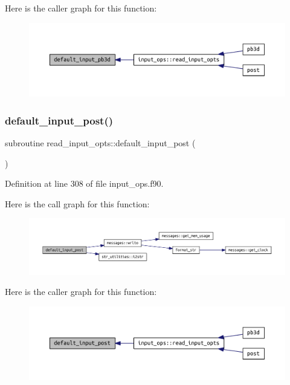 Here is the caller graph for this function\+:
\nopagebreak
\begin{figure}[H]
\begin{center}
\leavevmode
\includegraphics[width=350pt]{input__ops_8f90_a5137b6d81dcbf50b3eb6a000f6b8d2b8_icgraph}
\end{center}
\end{figure}
\mbox{\label{input__ops_8f90_a45cd1d003ad2ab71d12f71492935b2bb}} 
\subsubsection{\texorpdfstring{default\+\_\+input\+\_\+post()}{default\_input\_post()}}
{\footnotesize\ttfamily subroutine read\+\_\+input\+\_\+opts\+::default\+\_\+input\+\_\+post (\begin{DoxyParamCaption}{ }\end{DoxyParamCaption})}



Definition at line 308 of file input\+\_\+ops.\+f90.

Here is the call graph for this function\+:
\nopagebreak
\begin{figure}[H]
\begin{center}
\leavevmode
\includegraphics[width=350pt]{input__ops_8f90_a45cd1d003ad2ab71d12f71492935b2bb_cgraph}
\end{center}
\end{figure}
Here is the caller graph for this function\+:
\nopagebreak
\begin{figure}[H]
\begin{center}
\leavevmode
\includegraphics[width=350pt]{input__ops_8f90_a45cd1d003ad2ab71d12f71492935b2bb_icgraph}
\end{center}
\end{figure}
